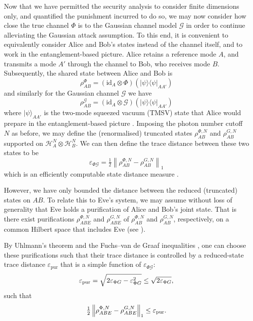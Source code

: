 ﻿\documentclass[12pt]{article}
\begin{document}
Now that we have permitted the security analysis to consider finite dimensions only, and quantified the punishment incurred to do so, we may now consider how close the true channel $\Phi$ is to the Gaussian channel model $\mathcal{G}$ in order to continue alleviating the Gaussian attack assumption. To this end, it is convenient to equivalently consider Alice and Bob's states instead of the channel itself, and to work in the entanglement-based picture. Alice retains a reference mode $A$, and transmits a mode $A'$ through the channel to Bob, who receives mode $B$. Subsequently, the shared state between Alice and Bob is
\begin{equation}
  \rho_{AB}^{\Phi} = (\mathrm{id}_A\otimes \Phi)(|\psi\rangle\langle\psi|_{AA'})
\end{equation}
and similarly for the Gaussian channel $\mathcal{G}$ we have
\begin{equation}
  \rho_{AB}^{\mathcal{G}} = (\mathrm{id}_A\otimes \mathcal{G})(|\psi\rangle\langle\psi|_{AA'})
\end{equation}
where $|\psi\rangle_{AA'}$ is the two-mode squeezed vacuum (TMSV) state that Alice would prepare in the entanglement-based picture \cite{Laudenbach-2018}. Imposing the photon number cutoff $N$ as before, we may define the (renormalised) truncated states $\rho_{AB}^{\Phi,N}$ and $\rho_{AB}^{G,N}$ supported on $\mathcal H_A^N\otimes \mathcal H_B^N$. We can then define the trace distance between these two states to be 
\begin{equation}
\label{eq: trace distance}
\varepsilon_{\Phi \mathcal{G}} = \tfrac{1}{2}\left\|\rho_{AB}^{\Phi,N}-\rho_{AB}^{G,N}\right\|_1
\end{equation}
which is an efficiently computable state distance measure \cite{Watrous-2018}.

However, we have only bounded the distance between the reduced (truncated) states on $AB$. To relate this to Eve's system, we may assume without loss of generality that Eve holds a purification of Alice and Bob's joint state. That is there exist purifications $\rho^{\Phi,N}_{ABE}$ and $\rho^{G,N}_{ABE}$ of $\rho^{\Phi,N}_{AB}$ and $\rho^{G,N}_{AB}$, respectively, on a common Hilbert space that includes Eve (see ).

By Uhlmann's theorem and the Fuchs--van de Graaf inequalities \cite{Watrous-2018}, one can choose these purifications
such that their trace distance is controlled by a reduced-state trace distance $\varepsilon_\text{pur}$ that is a simple function of $\varepsilon_{\Phi \mathcal{G}}$:
\begin{equation}
\label{eq: purification distance}
\varepsilon_{\rm pur}
=\sqrt{2\varepsilon_{\Phi G}-\varepsilon_{\Phi G}^2}
\le \sqrt{2\varepsilon_{\Phi G}},
\end{equation}
such that
\begin{equation}
\label{eq: Eve state distance}
\tfrac{1}{2}\left\|\rho_{ABE}^{\Phi,N}-\rho_{ABE}^{G,N}\right\|_1 \le \varepsilon_{\rm pur}.
\end{equation}
\end{document}
